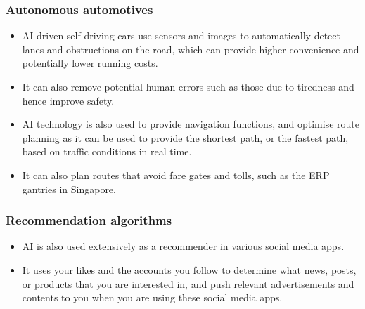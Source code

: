 \documentclass[11pt]{article}
\begin{document}
\subsubsection{Autonomous automotives}
\label{sec:org24da214}
\begin{itemize}
\item AI-driven self-driving cars use sensors and images to automatically detect lanes and obstructions on the road, which can provide higher convenience and potentially lower running costs.
\item It can also remove potential human errors such as those due to tiredness and hence improve safety.
\item AI technology is also used to provide navigation functions, and optimise route planning as it can be used to provide the shortest path, or the fastest path, based on traffic conditions in real time.
\item It can also plan routes that avoid fare gates and tolls, such as the ERP gantries in Singapore.
\end{itemize}

\subsubsection{Recommendation algorithms}
\label{sec:org2917af4}
\begin{itemize}
\item AI is also used extensively as a recommender in various social media apps.
\item It uses your likes and the accounts you follow to determine what news, posts, or products that you are interested in, and push relevant advertisements and contents to you when you are using these social media apps.
\end{itemize}
\end{document}

